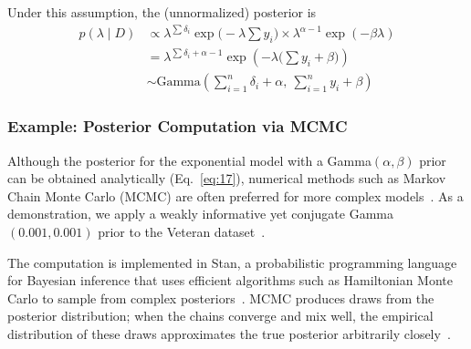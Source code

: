 Under this assumption, the (unnormalized) posterior is
\begin{align}
p(\lambda\mid D)
&\propto
\lambda^{\sum \delta_i}
\exp\Big(-\lambda \sum y_i\Big)
\times
\lambda^{\alpha - 1}
\exp(-\beta \lambda)\\
&=\lambda^{\sum \delta_i + \alpha - 1}
\exp \left( - \lambda \big(\sum y_i + \beta\big) \right) \\
&\sim
\text{Gamma}
\left(
\sum_{i=1}^{n} \delta_i + \alpha,\ \sum_{i=1}^{n} y_i + \beta
\right)
\label{eq:17}
\end{align}

\subsubsection{Example: Posterior Computation via MCMC}
Although the posterior for the exponential model with a Gamma$(\alpha,\beta)$ prior can be obtained analytically (Eq.~\ref{eq:17}), numerical methods such as Markov Chain Monte Carlo (MCMC) are often preferred for more complex models~\cite{robert2007bayesian,ibrahim2013bayesian}. As a demonstration, we apply a weakly informative yet conjugate Gamma$(0.001,0.001)$ prior to the Veteran dataset~\cite{survival-package}.

The computation is implemented in Stan, a probabilistic programming language for Bayesian inference that uses efficient algorithms such as Hamiltonian Monte Carlo to sample from complex posteriors~\cite{JSSv076i01}. MCMC produces draws from the posterior distribution; when the chains converge and mix well, the empirical distribution of these draws approximates the true posterior arbitrarily closely~\cite{https://doi.org/10.1111/2041-210X.12681}.

